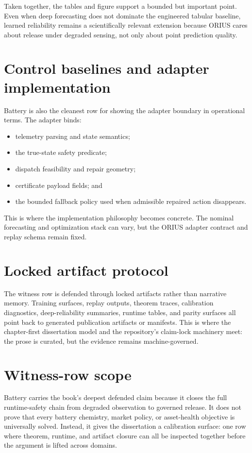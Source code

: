 Taken together, the tables and figure support a bounded but important point. Even when deep
forecasting does not dominate the engineered tabular baseline, learned reliability remains a
scientifically relevant extension because ORIUS cares about release under degraded sensing,
not only about point prediction quality.

\section{Control baselines and adapter implementation}
Battery is also the cleanest row for showing the adapter boundary in operational terms. The
adapter binds:
\begin{itemize}
  \item telemetry parsing and state semantics;
  \item the true-state safety predicate;
  \item dispatch feasibility and repair geometry;
  \item certificate payload fields; and
  \item the bounded fallback policy used when admissible repaired action disappears.
\end{itemize}
This is where the implementation philosophy becomes concrete. The nominal forecasting and
optimization stack can vary, but the ORIUS adapter contract and replay schema remain fixed.

\section{Locked artifact protocol}
The witness row is defended through locked artifacts rather than narrative memory. Training
surfaces, replay outputs, theorem traces, calibration diagnostics, deep-reliability
summaries, runtime tables, and parity surfaces all point back to generated publication
artifacts or manifests. This is where the chapter-first dissertation model and the
repository's claim-lock machinery meet: the prose is curated, but the evidence remains
machine-governed.

\section{Witness-row scope}
Battery carries the book's deepest defended claim because it closes the full runtime-safety
chain from degraded observation to governed release. It does not prove that every battery
chemistry, market policy, or asset-health objective is universally solved. Instead, it gives
the dissertation a calibration surface: one row where theorem, runtime, and artifact closure
can all be inspected together before the argument is lifted across domains.
